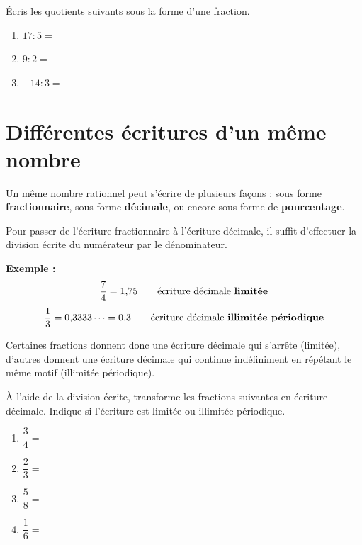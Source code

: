 \documentclass[../../syllabus_1.tex]{subfiles}
\begin{document}
\begin{itemize}
\begin{exercise}
    Écris les quotients suivants sous la forme d'une fraction.
    \begin{enumerate}[cols=3, itemsep=1cm]
        \item $17 : 5 = $
        \item $9 : 2 = $
        \item $-14 : 3 = $
    \end{enumerate}
\end{exercise}

\section{Différentes écritures d'un même nombre}

Un même nombre rationnel peut s'écrire de plusieurs façons : sous forme \textbf{fractionnaire}, sous forme \textbf{décimale}, ou encore sous forme de \textbf{pourcentage}.

Pour passer de l'écriture fractionnaire à l'écriture décimale, il suffit d'effectuer la division écrite du numérateur par le dénominateur.

\textbf{Exemple :}
\begin{equation*}
    \dfrac{7}{4} = 1{,}75 \qquad \text{écriture décimale \textbf{limitée}}
\end{equation*}
\begin{equation*}
    \dfrac{1}{3} = 0{,}3333\dots = 0{,}\overline{3} \qquad \text{écriture décimale \textbf{illimitée périodique}}
\end{equation*}

Certaines fractions donnent donc une écriture décimale qui s'arrête (limitée), d'autres donnent une écriture décimale qui continue indéfiniment en répétant le même motif (illimitée périodique).

\begin{exercise}
    À l'aide de la division écrite, transforme les fractions suivantes en écriture décimale. Indique si l'écriture est limitée ou illimitée périodique.
    \begin{enumerate}[cols=2, itemsep=2cm]
        \item $\dfrac{3}{4} = $
        \item $\dfrac{2}{3} = $
        \item $\dfrac{5}{8} = $
        \item $\dfrac{1}{6} = $
    \end{enumerate}
    \vspace{1cm}
\end{exercise}


\end{itemize}
\end{document}
